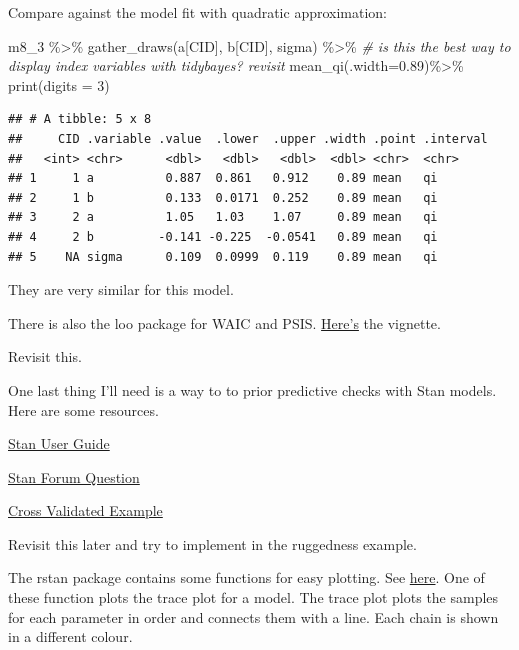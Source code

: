 \documentclass[
]{book}
\newenvironment{Shaded}{\begin{snugshade}}{\end{snugshade}}
\newcommand{\AttributeTok}[1]{\textcolor[rgb]{0.77,0.63,0.00}{#1}}
\newcommand{\CommentTok}[1]{\textcolor[rgb]{0.56,0.35,0.01}{\textit{#1}}}
\newcommand{\DecValTok}[1]{\textcolor[rgb]{0.00,0.00,0.81}{#1}}
\newcommand{\FloatTok}[1]{\textcolor[rgb]{0.00,0.00,0.81}{#1}}
\newcommand{\FunctionTok}[1]{\textcolor[rgb]{0.00,0.00,0.00}{#1}}
\newcommand{\NormalTok}[1]{#1}
\newcommand{\SpecialCharTok}[1]{\textcolor[rgb]{0.00,0.00,0.00}{#1}}
\begin{document}
Compare against the model fit with quadratic approximation:

\begin{Shaded}
\begin{Highlighting}[]
\NormalTok{m8\_3 }\SpecialCharTok{\%\textgreater{}\%}
  \FunctionTok{gather\_draws}\NormalTok{(a[CID], b[CID], sigma) }\SpecialCharTok{\%\textgreater{}\%} \CommentTok{\# is this the best way to display index variables with tidybayes? revisit}
  \FunctionTok{mean\_qi}\NormalTok{(}\AttributeTok{.width=}\FloatTok{0.89}\NormalTok{)}\SpecialCharTok{\%\textgreater{}\%}
  \FunctionTok{print}\NormalTok{(}\AttributeTok{digits =} \DecValTok{3}\NormalTok{)}
\end{Highlighting}
\end{Shaded}

\begin{verbatim}
## # A tibble: 5 x 8
##     CID .variable .value  .lower  .upper .width .point .interval
##   <int> <chr>      <dbl>   <dbl>   <dbl>  <dbl> <chr>  <chr>    
## 1     1 a          0.887  0.861   0.912    0.89 mean   qi       
## 2     1 b          0.133  0.0171  0.252    0.89 mean   qi       
## 3     2 a          1.05   1.03    1.07     0.89 mean   qi       
## 4     2 b         -0.141 -0.225  -0.0541   0.89 mean   qi       
## 5    NA sigma      0.109  0.0999  0.119    0.89 mean   qi
\end{verbatim}

They are very similar for this model.

There is also the loo package for WAIC and PSIS. \href{http://mc-stan.org/loo/articles/loo2-example.html}{Here's} the vignette.

Revisit this.

One last thing I'll need is a way to to prior predictive checks with Stan models. Here are some resources.

\href{https://mc-stan.org/docs/2_27/stan-users-guide/prior-predictive-checks.html\#coding-prior-predictive-checks-in-stan}{Stan User Guide}

\href{https://discourse.mc-stan.org/t/implementing-prior-predictive-checks-in-stan/23815}{Stan Forum Question}

\href{https://stats.stackexchange.com/questions/233944/how-to-plot-prior-distributions-in-stan}{Cross Validated Example}

Revisit this later and try to implement in the ruggedness example.

The rstan package contains some functions for easy plotting. See \href{https://mc-stan.org/rstan/reference/stan_plot.html}{here}. One of these function plots the trace plot for a model. The trace plot plots the samples for each parameter in order and connects them with a line. Each chain is shown in a different colour.
\end{document}
